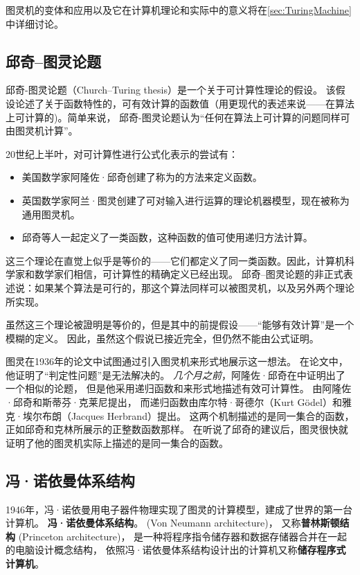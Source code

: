 图灵机的变体和应用以及它在计算机理论和实际中的意义将在\cref{sec:TuringMachine}中详细讨论。

\subsection{邱奇--图灵论题}
邱奇-图灵论题（Church--Turing thesis）是一个关于可计算性理论的假设。
该假设论述了关于函数特性的，可有效计算的函数值（用更现代的表述来说——在算法上可计算的)。简单来说，
邱奇-图灵论题认为``任何在算法上可计算的问题同样可由图灵机计算''。

20世纪上半叶，对可计算性进行公式化表示的尝试有：
\begin{itemize}
  \item 美国数学家阿隆佐·邱奇创建了称为\LambdaCalculus 的方法来定义函数。
  \item 英国数学家阿兰·图灵创建了可对输入进行运算的理论机器模型，现在被称为通用图灵机。
  \item 邱奇等人一起定义了一类函数，这种函数的值可使用递归方法计算。
\end{itemize}

这三个理论在直觉上似乎是等价的——它们都定义了同一类函数。因此，计算机科学家和数学家们相信，可计算性的精确定义已经出现。
邱奇--图灵论题的非正式表述说：如果某个算法是可行的，那这个算法同样可以被图灵机，以及另外两个理论所实现。

虽然这三个理论被證明是等价的，但是其中的前提假设——``能够有效计算''是一个模糊的定义。
因此，虽然这个假说已接近完全，但仍然不能由公式证明。

图灵在1936年的论文\cite{doi:10.1112/plms/s2-42.1.230}中试图通过引入图灵机来形式地展示这一想法。
在论文中，他证明了``判定性问题''是无法解决的。
\emph{几个月之前}，阿隆佐·邱奇在\cite{DBLP:journals/jsyml/Church36}中证明出了一个相似的论题，
但是他采用递归函数和\LambdaCalculus 来形式地描述有效可计算性。
\LambdaCalculus 由阿隆佐·邱奇和斯蒂芬·克莱尼提出\cite{10.2307/2372027,bernays_1936}，
而递归函数由库尔特·哥德尔（Kurt G\"odel）和雅克·埃尔布朗（Jacques Herbrand）提出。
这两个机制描述的是同一集合的函数，正如邱奇和克林所展示的正整数函数那样。
在听说了邱奇的建议后，图灵很快就证明了他的图灵机实际上描述的是同一集合的函数。

\def\VonNeumann{冯·诺依曼}
\def\VonArch{\VonNeumann 体系结构}
\subsection{\VonArch}

1946年，\VonNeumann 用电子器件物理实现了图灵的计算模型，建成了世界的第一台计算机。
\textbf{\VonArch}\cite{DBLP:journals/annals/Neumann93}。 (Von Neumann architecture)，
又称\textbf{普林斯顿结构} (Princeton architecture)，
是一种将程序指令储存器和数据存储器合并在一起的电脑设计概念结构，
依照\VonArch 设计出的计算机又称\textbf{储存程序式计算机}。

